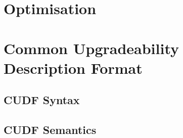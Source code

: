 \section{Optimisation}

\section{Common Upgradeability Description Format}

\subsection{CUDF Syntax}

\subsection{CUDF Semantics}




